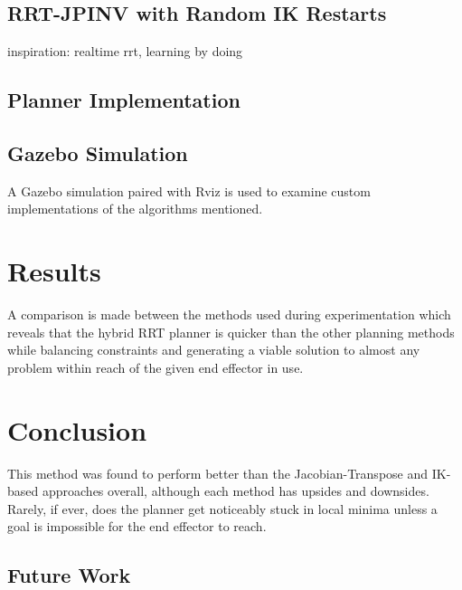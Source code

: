 \documentclass[conference]{IEEEtran} \usepackage[T1]{fontenc} \usepackage[backend=biber, style=ieee]{biblatex}
\begin{document}
\subsection{RRT-JPINV with Random IK Restarts}


inspiration: realtime rrt, learning by doing


\subsection{Planner Implementation} \label{Planner Implementation}

\subsection{Gazebo Simulation} \label{Gazebo Simulation}
 A Gazebo simulation paired with Rviz is used to examine custom implementations of the algorithms mentioned. 
 
\section{Results} \label{Results}
A comparison is made between the methods used 
during experimentation which reveals that the hybrid RRT planner is quicker than the other planning methods while balancing constraints and generating a viable solution to 
almost any problem within reach of the given end effector in use.

\section{Conclusion} \label{Conclusion} 
This method was found to perform better than the Jacobian-Transpose and IK-based approaches overall, although 
each method has upsides and downsides. Rarely, if ever, does the planner get noticeably stuck in local minima unless a goal is impossible for the end effector to 
reach.

\subsection{Future Work}

\printbibliography
\end{document}
